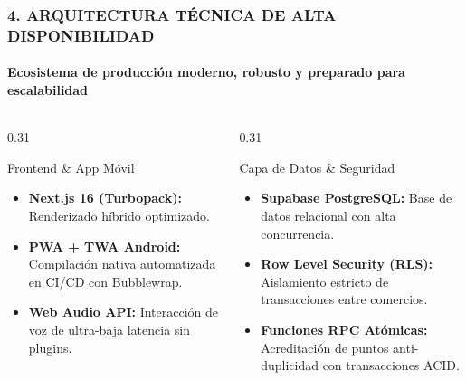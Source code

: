 \documentclass[aspectratio=169, 10pt]{beamer}
\begin{document}
\begin{frame}
  \frametitle{4. ARQUITECTURA TÉCNICA DE ALTA DISPONIBILIDAD}
  \framesubtitle{Ecosistema de producción moderno, robusto y preparado para escalabilidad}

  \begin{columns}[T]
    \begin{column}{0.31\textwidth}
      \begin{alertblock}{Frontend \& App Móvil}
        \scriptsize
        \begin{itemize}\setlength\itemsep{0.25em}
          \item \textbf{Next.js 16 (Turbopack):} Renderizado híbrido optimizado.
          \item \textbf{PWA + TWA Android:} Compilación nativa automatizada en CI/CD con Bubblewrap.
          \item \textbf{Web Audio API:} Interacción de voz de ultra-baja latencia sin plugins.
        \end{itemize}
      \end{alertblock}
    \end{column}

    \begin{column}{0.31\textwidth}
      \begin{block}{Capa de Datos \& Seguridad}
        \scriptsize
        \begin{itemize}\setlength\itemsep{0.25em}
          \item \textbf{Supabase PostgreSQL:} Base de datos relacional con alta concurrencia.
          \item \textbf{Row Level Security (RLS):} Aislamiento estricto de transacciones entre comercios.
          \item \textbf{Funciones RPC Atómicas:} Acreditación de puntos anti-duplicidad con transacciones ACID.
        \end{itemize}
      \end{block}
    \end{column}


\end{columns}
\end{frame}
\end{document}
